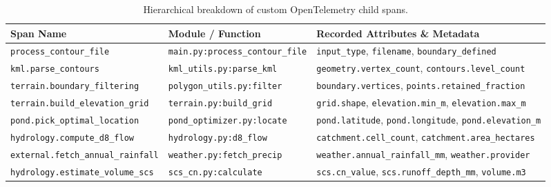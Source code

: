 \documentclass[11pt,a4paper]{article}
\begin{document}
\begin{table}[H]
    \centering
    \small
    \begin{tabularx}{\textwidth}{l l X}
        \toprule
        \textbf{Span Name} & \textbf{Module / Function} & \textbf{Recorded Attributes \& Metadata} \\
        \midrule
        \texttt{process\_contour\_file} & \texttt{main.py:process\_contour\_file} & \texttt{input\_type}, \texttt{filename}, \texttt{boundary\_defined} \\
        \texttt{kml.parse\_contours} & \texttt{kml\_utils.py:parse\_kml} & \texttt{geometry.vertex\_count}, \texttt{contours.level\_count} \\
        \texttt{terrain.boundary\_filtering} & \texttt{polygon\_utils.py:filter} & \texttt{boundary.vertices}, \texttt{points.retained\_fraction} \\
        \texttt{terrain.build\_elevation\_grid} & \texttt{terrain.py:build\_grid} & \texttt{grid.shape}, \texttt{elevation.min\_m}, \texttt{elevation.max\_m} \\
        \texttt{pond.pick\_optimal\_location} & \texttt{pond\_optimizer.py:locate} & \texttt{pond.latitude}, \texttt{pond.longitude}, \texttt{pond.elevation\_m} \\
        \texttt{hydrology.compute\_d8\_flow} & \texttt{hydrology.py:d8\_flow} & \texttt{catchment.cell\_count}, \texttt{catchment.area\_hectares} \\
        \texttt{external.fetch\_annual\_rainfall}& \texttt{weather.py:fetch\_precip} & \texttt{weather.annual\_rainfall\_mm}, \texttt{weather.provider} \\
        \texttt{hydrology.estimate\_volume\_scs} & \texttt{scs\_cn.py:calculate} & \texttt{scs.cn\_value}, \texttt{scs.runoff\_depth\_mm}, \texttt{volume.m3} \\
        \bottomrule
    \end{tabularx}
    \caption{Hierarchical breakdown of custom OpenTelemetry child spans.}
    \label{tab:spans_table}
\end{table}
\end{document}
